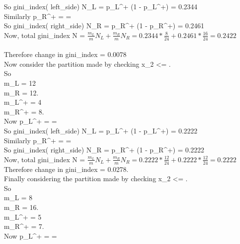 \documentclass[twoside,10pt,a4paper]{article}
\theoremstyle{definition}
\theoremstyle{definition}
\theoremstyle{remark}
\renewcommand{\>}{{\rightarrow}}
\newcommand{\1}{{\mathbf 1}}
\newcommand{\0}{{\mathbf 0}}
\begin{document}
So
gini\_index( left\_side) N_L = p_L^+ (1 - p_L^+) = 0.2344\\

Similarly
p_R^+ =  =  \\

So
gini\_index( right\_side) N_R = p_R^+ (1 - p_R^+) = 0.2461\\

Now, total gini\_index N = $\frac{ m_L }{ m } N_L + \frac{m_R}{m} N_R = 0.2344 * \frac{8}{24} + 0.2461 * \frac{16}{24} = 0.2422$\\ ~\\

Therefore change in gini\_index = 0.0078\\

Now consider the partition made by checking x_2 <= .\\

So \\
m_L = 12 \\
m_R = 12.\\
m_L^+ = 4 \\
m_R^+ = 8.\\

Now
p_L^+ =  =  \\

So
gini\_index( left\_side) N_L = p_L^+ (1 - p_L^+) = 0.2222\\

Similarly
p_R^+ =  =  \\

So
gini\_index( right\_side) N_R = p_R^+ (1 - p_R^+) = 0.2222\\

Now, total gini\_index N = $\frac{ m_L }{ m } N_L + \frac{m_R}{m} N_R = 0.2222 * \frac{12}{24} + 0.2222 * \frac{12}{24} = 0.2222$\\

Therefore change in gini\_index = 0.0278.\\

Finally considering the partition made by checking x_2 <= .\\

So \\
m_L = 8 \\
m_R = 16.\\
m_L^+ = 5 \\
m_R^+ = 7.\\

Now
p_L^+ =  =  \\
\end{document}
